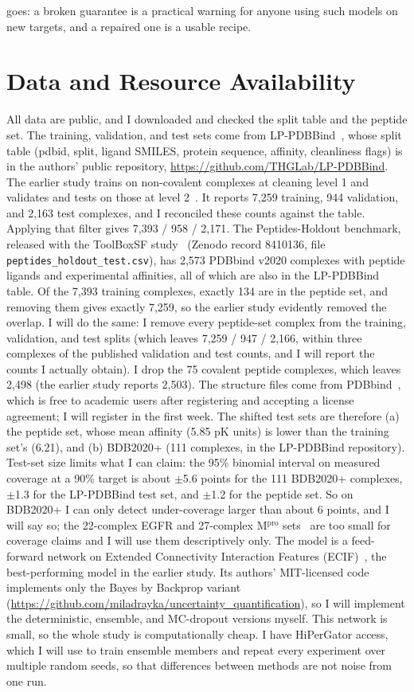 \documentclass[11pt]{article}
\begin{document}
goes: a broken guarantee is a practical warning for anyone using such models on new targets, and a repaired one is a usable recipe.

\section*{Data and Resource Availability}

All data are public, and I downloaded and checked the split table and the peptide set. The training, validation, and test sets come from LP-PDBBind~\cite{lppdbbind}, whose split table (pdbid, split, ligand SMILES, protein sequence, affinity, cleanliness flags) is in the authors' public repository, \url{https://github.com/THGLab/LP-PDBBind}. The earlier study trains on non-covalent complexes at cleaning level 1 and validates and tests on those at level 2~\cite{rayka2025}. It reports 7,259 training, 944 validation, and 2,163 test complexes, and I reconciled these counts against the table. Applying that filter gives 7,393 / 958 / 2,171. The Peptides-Holdout benchmark, released with the ToolBoxSF study~\cite{durant2025} (Zenodo record 8410136, file \texttt{peptides\_holdout\_test.csv}), has 2,573 PDBbind v2020 complexes with peptide ligands and experimental affinities, all of which are also in the LP-PDBBind table. Of the 7,393 training complexes, exactly 134 are in the peptide set, and removing them gives exactly 7,259, so the earlier study evidently removed the overlap. I will do the same: I remove every peptide-set complex from the training, validation, and test splits (which leaves 7,259 / 947 / 2,166, within three complexes of the published validation and test counts, and I will report the counts I actually obtain). I drop the 75 covalent peptide complexes, which leaves 2,498 (the earlier study reports 2,503). The structure files come from PDBbind~\cite{pdbbind}, which is free to academic users after registering and accepting a license agreement; I will register in the first week. The shifted test sets are therefore (a) the peptide set, whose mean affinity (5.85 pK units) is lower than the training set's (6.21), and (b) BDB2020+ (111 complexes, in the LP-PDBBind repository). Test-set size limits what I can claim: the 95\% binomial interval on measured coverage at a 90\% target is about $\pm$5.6 points for the 111 BDB2020+ complexes, $\pm$1.3 for the LP-PDBBind test set, and $\pm$1.2 for the peptide set. So on BDB2020+ I can only detect under-coverage larger than about 6 points, and I will say so; the 22-complex EGFR and 27-complex M$^{\text{pro}}$ sets~\cite{rayka2025} are too small for coverage claims and I will use them descriptively only. The model is a feed-forward network on Extended Connectivity Interaction Features (ECIF)~\cite{ecif}, the best-performing model in the earlier study. Its authors' MIT-licensed code implements only the Bayes by Backprop variant (\url{https://github.com/miladrayka/uncertainty_quantification}), so I will implement the deterministic, ensemble, and MC-dropout versions myself. This network is small, so the whole study is computationally cheap. I have HiPerGator access, which I will use to train ensemble members and repeat every experiment over multiple random seeds, so that differences between methods are not noise from one run. 
\end{document}

